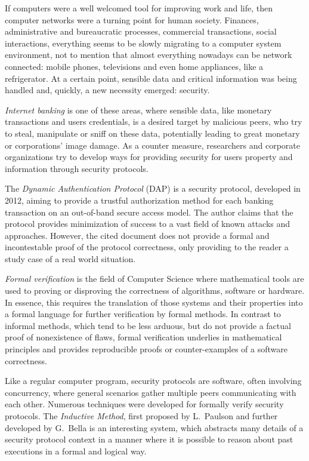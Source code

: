 If computers were a well welcomed tool for improving work and life, then computer networks were a turning point for human society. Finances, administrative and bureaucratic processes, commercial transactions, social interactions, everything seems to be slowly migrating to a computer system environment, not to mention that almost everything nowadays can be network connected: mobile phones, televisions and even home appliances, like a refrigerator. At a certain point, sensible data and critical information was being handled and, quickly, a new necessity emerged: security.

\textit{Internet banking} is one of these areas, where sensible data, like monetary transactions and users credentials, is a desired target by malicious peers, who try to steal, manipulate or sniff on these data, potentially leading to great monetary or corporations' image damage. As a counter measure, researchers and corporate organizations try to develop ways for providing security for users property and information through security protocols.

The \textit{Dynamic Authentication Protocol} (DAP) \cite{bbcode-thesis} is a security protocol, developed in 2012, aiming to provide a trustful authorization method for each banking transaction on an out-of-band secure access model. The author claims that the protocol provides minimization of success to a vast field of known attacks and approaches. However, the cited document does not provide a formal and incontestable proof of the protocol correctness, only providing to the reader a study case of a real world situation.

\textit{Formal verification} is the field of Computer Science where mathematical tools are used to proving or disproving the correctness of algorithms, software or hardware. In essence, this requires the translation of those systems and their properties into a formal language for further verification by formal methods. In contrast to informal methods, which tend to be less arduous, but do not provide a factual proof of nonexistence of flaws, formal verification underlies in mathematical principles and provides reproducible proofs or counter-examples of a software correctness.

Like a regular computer program, security protocols are software, often involving concurrency, where general scenarios gather multiple peers communicating with each other. Numerous techniques were developed for formally verify security protocols. The \textit{Inductive Method}, first proposed by L.~Paulson \cite{paulson-inductive} and further developed by G.~Bella \cite{bella-book} is an interesting system, which abstracts many details of a security protocol context in a manner where it is possible to reason about past executions in a formal and logical way.

